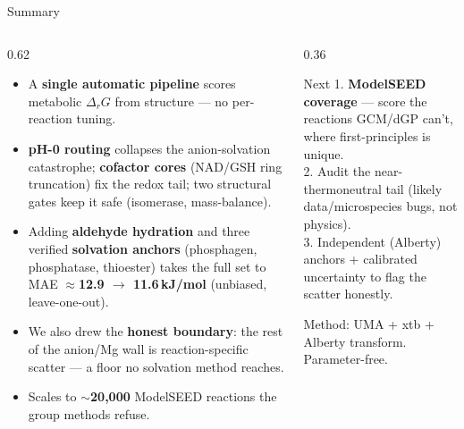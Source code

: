 \documentclass[aspectratio=169,11pt]{beamer}
\newcommand{\kj}{\,kJ/mol}
\newcommand{\arw}{$\rightarrow$}
\begin{document}
\begin{frame}{Summary}
  \begin{columns}[T]
    \begin{column}{0.62\textwidth}
      \begin{itemize}
        \item A \textbf{single automatic pipeline} scores metabolic $\Delta_r G$ from structure — no per-reaction tuning.
        \item \textbf{pH-0 routing} collapses the anion-solvation catastrophe; \textbf{cofactor cores} (NAD/GSH ring truncation) fix the redox tail; two structural gates keep it safe (isomerase, mass-balance).
        \item Adding \textbf{aldehyde hydration} and three verified \textbf{solvation anchors} (phosphagen, phosphatase, thioester) takes the full set to MAE \textbf{$\approx$12.9 \arw{} 11.6\kj} (unbiased, leave-one-out).
        \item We also drew the \textbf{honest boundary}: the rest of the anion/Mg wall is reaction-specific scatter --- a floor no solvation method reaches.
        \item Scales to $\sim$\textbf{20{,}000} ModelSEED reactions the group methods refuse.
      \end{itemize}
    \end{column}
    \begin{column}{0.36\textwidth}
      \begin{block}{Next}
        \footnotesize
        1. \textbf{ModelSEED coverage} --- score the reactions GCM/dGP can't, where first-principles is unique.\\
        2. Audit the near-thermoneutral tail (likely data/microspecies bugs, not physics).\\
        3. Independent (Alberty) anchors + calibrated uncertainty to flag the scatter honestly.
      \end{block}
      \vspace{0.5em}
      {\scriptsize\color{brandgray} Method: UMA + xtb + Alberty transform. Parameter-free.}
    \end{column}
  \end{columns}
  \vfill
\end{frame}
\end{document}
